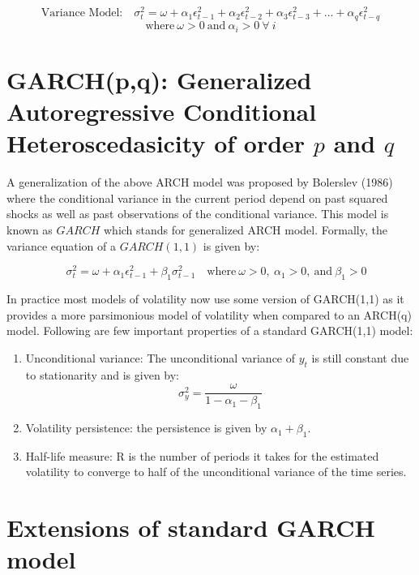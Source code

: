 \documentclass[]{book}
\theoremstyle{definition}
\theoremstyle{definition}
\theoremstyle{definition}
\theoremstyle{remark}
\begin{document}
\[\text{Variance Model:} \quad  \sigma_t^2=\omega +\alpha_1 \epsilon_{t-1}^2+\alpha_2 \epsilon_{t-2}^2 +\alpha_3 \epsilon_{t-3}^2 +...+ \alpha_q \epsilon_{t-q}^2 \]
\[\text{where} \ \omega>0 \ \text{and} \ \alpha_i>0 \ \forall \ i\]

\hypertarget{garchpq-generalized-autoregressive-conditional-heteroscedasicity-of-order-p-and-q}{%
\section{\texorpdfstring{GARCH(p,q): Generalized Autoregressive
Conditional Heteroscedasicity of order \(p\) and
\(q\)}{GARCH(p,q): Generalized Autoregressive Conditional Heteroscedasicity of order p and q}}\label{garchpq-generalized-autoregressive-conditional-heteroscedasicity-of-order-p-and-q}}

A generalization of the above ARCH model was proposed by Bolerslev
(1986) where the conditional variance in the current period depend on
past squared shocks as well as past observations of the conditional
variance. This model is known as \(GARCH\) which stands for generalized
ARCH model. Formally, the variance equation of a \(GARCH(1,1)\) is given
by:

\[\quad  \sigma_t^2=\omega +\alpha_1 \epsilon_{t-1}^2 +\beta_1 \sigma^2_{t-1} \quad \text{where} \ \omega>0, \ \alpha_1>0, \ \text{and} \ \beta_1>0 \]

In practice most models of volatility now use some version of GARCH(1,1)
as it provides a more parsimonious model of volatility when compared to
an ARCH(q) model. Following are few important properties of a standard
GARCH(1,1) model:

\begin{enumerate}
\def\labelenumi{\roman{enumi}.}
\item
  Unconditional variance: The unconditional variance of \(y_t\) is still
  constant due to stationarity and is given by:
  \[\sigma^2_y = \frac{\omega}{1-\alpha_1-\beta_1}\]
\item
  Volatility persistence: the persistence is given by
  \(\alpha_1+\beta_1\).
\item
  Half-life measure: R is the number of periods it takes for the
  estimated volatility to converge to half of the unconditional variance
  of the time series.
\end{enumerate}

\hypertarget{extensions-of-standard-garch-model}{%
\section{Extensions of standard GARCH
model}\label{extensions-of-standard-garch-model}}
\end{document}
